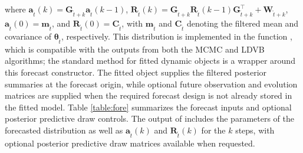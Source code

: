 \documentclass{jss}
\newcommand{\vect}[1]{\boldsymbol{#1}}
\newcommand{\mat}[1]{\mathbf{#1}}
\begin{document}
where $\mat{a}_{\tilde{t}}(k) = \mat{G}_{\tilde{t}+k} \mat{a}_{\tilde{t}}(k-1)$, $\mat{R}_{\tilde{t}}(k) = \mat{G}_{\tilde{t}+k} \mat{R}_{\tilde{t}}(k-1) \mat{G}_{\tilde{t}+k}^\top + \mat{W}_{\tilde{t}+k}$, $\mat{a}_{\tilde{t}}(0) = \mat{m}_{\tilde{t}}$, and $\mat{R}_{\tilde{t}}(0) = \mat{C}_{\tilde{t}}$, with $\mat{m}_{\tilde{t}}$ and $\mat{C}_{\tilde{t}}$ denoting the filtered mean and covariance of $\vect{\theta}_{\tilde{t}}$, respectively. This distribution is implemented in the function , which is compatible with the outputs from both the MCMC and LDVB algorithms; the standard  method for fitted dynamic objects is a wrapper around this forecast constructor. The fitted object supplies the filtered posterior summaries at the forecast origin, while optional future observation and evolution matrices are supplied when the required forecast design is not already stored in the fitted model. Table \ref{table:fore} summarizes the forecast inputs and optional posterior predictive draw controls. The output of  includes the parameters of the forecasted distribution as well as $\mat{a}_{\tilde{t}}(k)$ and $\mat{R}_{\tilde{t}}(k)$ for the $k$ steps, with optional posterior predictive draw matrices available when requested.
\end{document}
